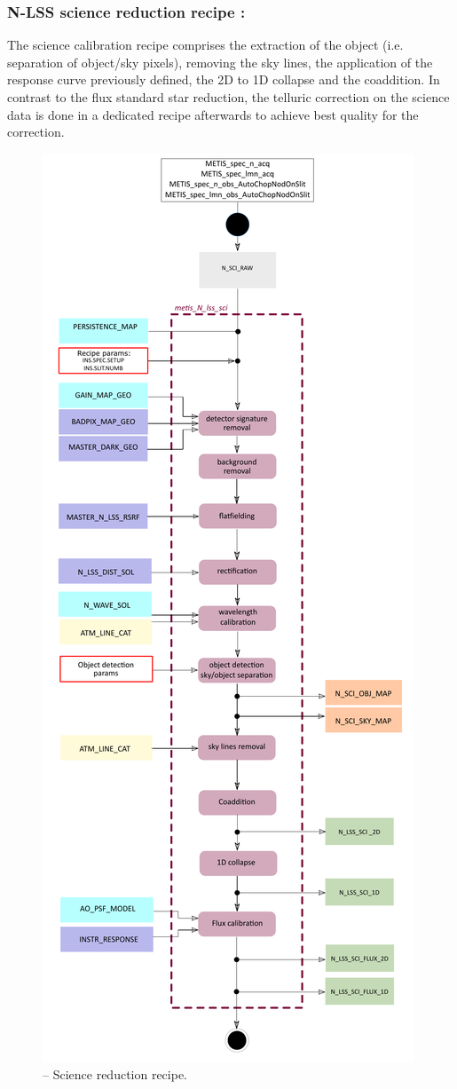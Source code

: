 \subsubsection{N-LSS science reduction recipe :}
The science calibration recipe comprises the extraction of the object (i.e. separation of object/sky pixels), removing the sky lines, the application of the response curve previously defined, the 2D to 1D collapse and the coaddition. In contrast to the flux standard star reduction, the telluric correction on the science data is done in a dedicated recipe afterwards to achieve best quality for the correction.
\begin{figure}[ht]
  \centering
  \includegraphics[width=0.4\textheight]{figures/metis_N_lss_sci_v0.72.pdf}
  \caption[Recipe: ]{ --
    Science reduction recipe.}
  \label{Fig:rec_N_lss_sci}
\end{figure}
